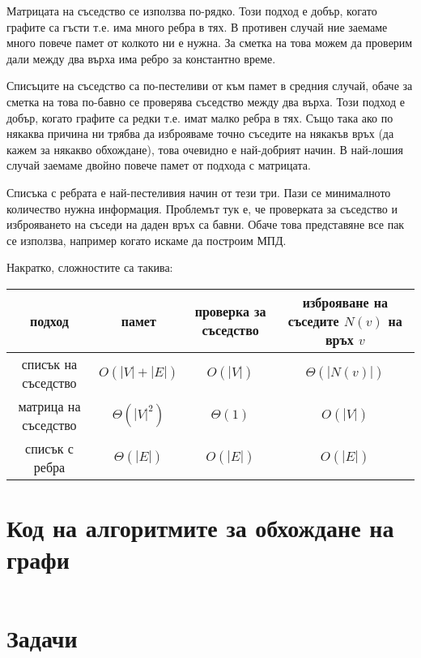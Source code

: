 \documentclass{article}
\theoremstyle{definition}
\theoremstyle{plain}
\theoremstyle{remark}
\theoremstyle{definition}
\begin{document}
Матрицата на съседство се използва по-рядко.
Този подход е добър, когато графите са гъсти т.е. има много ребра в тях.
В противен случай ние заемаме много повече памет от колкото ни е нужна.
За сметка на това можем да проверим дали между два върха има ребро за константно време.

Списъците на съседство са по-пестеливи от към памет в средния случай, обаче за сметка на това по-бавно се проверява съседство между два върха.
Този подход е добър, когато графите са редки т.е. имат малко ребра в тях.
Също така ако по някаква причина ни трябва да изброяваме точно съседите на някакъв връх (да кажем за някакво обхождане), това очевидно е най-добрият начин.
В най-лошия случай заемаме двойно повече памет от подхода с матрицата.

Списъка с ребрата е най-пестеливия начин от тези три.
Пази се минималното количество нужна информация.
Проблемът тук е, че проверката за съседство и изброяването на съседи на даден връх са бавни.
Обаче това представяне все пак се използва, например когато искаме да построим МПД.

Накратко, сложностите са такива:
\begin{center}
  \begin{tabular}{|c|c|c|c|}
    \hline
    подход               & памет           & проверка за съседство & изброяване на съседите $N(v)$ на връх $v$ \\
    \hline
    списък на съседство  & $O(|V| + |E|)$  & $O(|V|)$              & $\Theta(|N(v)|)$                          \\
    \hline
    матрица на съседство & $\Theta(|V|^2)$ & $\Theta(1)$           & $O(|V|)$                                  \\
    \hline
    списък с ребра       & $\Theta(|E|)$   & $O(|E|)$              & $O(|E|)$                                  \\
    \hline
  \end{tabular}
\end{center}

\section*{Код на алгоритмите за обхождане на графи}

\inputminted[linenos]{c++}{algorithms/traversal.cpp}

\section*{Задачи}
\end{document}
